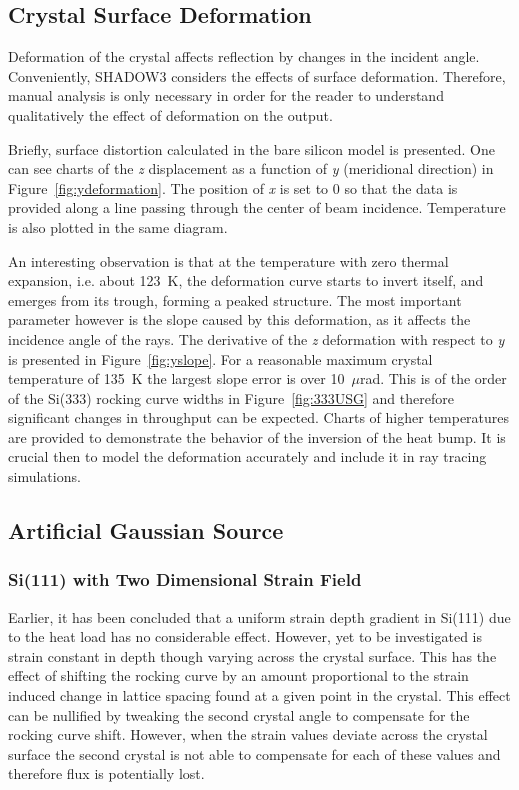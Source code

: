 \documentclass{iucr}
\begin{document}
\subsection{Crystal Surface Deformation}\label{deformation}

Deformation of the crystal affects reflection by changes in the incident angle. Conveniently, SHADOW3 considers the effects of surface deformation. Therefore, manual analysis is only necessary in order for the reader to understand qualitatively the effect of deformation on the output.

Briefly, surface distortion calculated in the bare silicon model is presented. One can see charts of the \textit{z} displacement as a function of \textit{y} (meridional direction) in Figure~\ref{fig:ydeformation}. The position of \textit{x} is set to 0 so that the data is provided along a line passing through the center of beam incidence. Temperature is also plotted in the same diagram.

An interesting observation is that at the temperature with zero thermal expansion, i.e. about 123~K, the deformation curve starts to invert itself, and emerges from its trough, forming a peaked structure. The most important parameter however is the slope caused by this deformation, as it affects the incidence angle of the rays. The derivative of the \textit{z} deformation with respect to \textit{y} is presented in Figure~\ref{fig:yslope}. For a reasonable maximum crystal temperature of 135~K the largest slope error is over 10~$\mu$rad. This is of the order of the Si(333) rocking curve widths in Figure~\ref{fig:333USG} and therefore significant changes in throughput can be expected. Charts of higher temperatures are provided to demonstrate the behavior of the inversion of the heat bump. It is crucial then to model the deformation accurately and include it in ray tracing simulations.

\subsection{Artificial Gaussian Source}\label{gaussian}

\subsubsection{Si(111) with Two Dimensional Strain Field}\label{111simulation}
Earlier, it has been concluded that a uniform strain depth gradient in Si(111) due to the heat load has no considerable effect. However, yet to be investigated is strain constant in depth though varying across the crystal surface. This has the effect of shifting the rocking curve by an amount proportional to the strain induced change in lattice spacing found at a given point in the crystal. This effect can be nullified by tweaking the second crystal angle to compensate for the rocking curve shift. However, when the strain values deviate across the crystal surface the second crystal is not able to compensate for each of these values and therefore flux is potentially lost.
\end{document}
